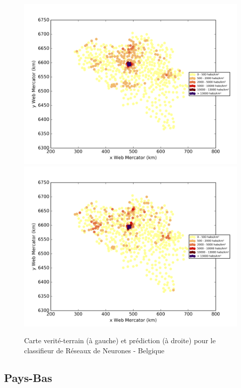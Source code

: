 \documentclass{book}
\begin{document}
\begin{figure}[H]
\centerline{
\includegraphics[scale=0.5]{../../data/Belgique/test/Neural_Network_Classification-oversampling/Neural_Network_Classification-oversampling/density_ground_truth.png}
\includegraphics[scale=0.5]{../../data/Belgique/test/Neural_Network_Classification-oversampling/Neural_Network_Classification-oversampling/density_classification.png}
}
\caption{Carte verité-terrain (à gauche) et prédiction (à droite) pour le classifieur de Réseaux de Neurones - Belgique}
\label{nn_carte_belgique}
\end{figure}


\subsection{Pays-Bas}
\end{document}
